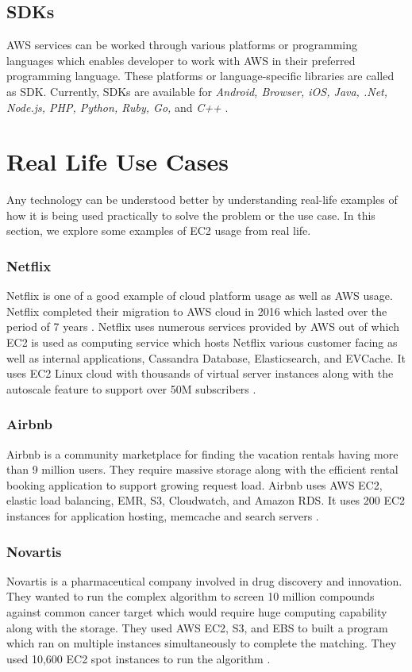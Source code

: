 \subsection{SDKs}
AWS services can be worked through various platforms or programming languages which enables developer to work with AWS in their preferred programming language. These platforms or language-specific libraries are called as SDK. Currently, SDKs are available for \emph{Android, Browser, iOS, Java, .Net, Node.js, PHP, Python, Ruby, Go,} and \emph{C++} \cite{www-aws-ec2-sdk}. 

\section{Real Life Use Cases}
Any technology can be understood better by understanding real-life examples of how it is being used practically to solve the problem or the use case. In this section, we explore some examples of EC2 usage from real life.

\subsubsection{Netflix}
Netflix is one of a good example of cloud platform usage as well as AWS usage. Netflix completed their migration to AWS cloud in 2016 which lasted over the period of 7 years \cite{www-media-netflix}. Netflix uses numerous services provided by AWS out of which EC2 is used as computing service which hosts Netflix various customer facing as well as internal applications, Cassandra Database, Elasticsearch, and EVCache. It uses EC2 Linux cloud with thousands of virtual server instances along with the autoscale feature to support over 50M subscribers \cite{www-brendangregg}.

\subsubsection{Airbnb}
Airbnb is a community marketplace for finding the vacation rentals having more than 9 million users. They require massive storage along with the efficient rental booking application to support growing request load. Airbnb uses AWS EC2, elastic load balancing, EMR, S3, Cloudwatch, and Amazon RDS. It uses 200 EC2 instances for application hosting, memcache and search servers \cite{www-aws-ec2-airbnb}.

\subsubsection{Novartis}
Novartis is a pharmaceutical company involved in drug discovery and innovation. They wanted to run the complex algorithm to screen 10 million compounds against common cancer target which would require huge computing capability along with the storage. They used AWS EC2, S3, and EBS to built a program which ran on multiple instances simultaneously to complete the matching. They used 10,600 EC2 spot instances to run the algorithm \cite{www-aws-ec2-novartis}.

